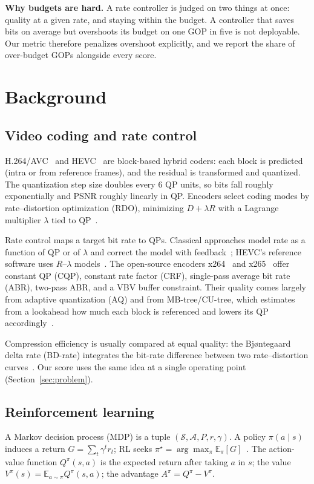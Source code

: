 \documentclass[conference]{IEEEtran}
\begin{document}
\textbf{Why budgets are hard.} A rate controller is judged on two things at once: quality at a given rate, and staying within the budget. A controller that saves bits on average but overshoots its budget on one GOP in five is not deployable. Our metric therefore penalizes overshoot explicitly, and we report the share of over-budget GOPs alongside every score.

\section{Background}
\subsection{Video coding and rate control}
H.264/AVC~\cite{wiegand2003h264} and HEVC~\cite{sullivan2012hevc} are block-based hybrid coders: each block is predicted (intra or from reference frames), and the residual is transformed and quantized. The quantization step size doubles every 6 QP units, so bits fall roughly exponentially and PSNR roughly linearly in QP. Encoders select coding modes by rate--distortion optimization (RDO), minimizing $D + \lambda R$ with a Lagrange multiplier $\lambda$ tied to QP~\cite{sullivan1998rdo,ortega1998rd}.

Rate control maps a target bit rate to QPs. Classical approaches model rate as a function of QP or of $\lambda$ and correct the model with feedback~\cite{chen2007rcsurvey}; HEVC's reference software uses $R$--$\lambda$ models~\cite{li2014lambda}. The open-source encoders x264~\cite{x264} and x265~\cite{x265} offer constant QP (CQP), constant rate factor (CRF), single-pass average bit rate (ABR), two-pass ABR, and a VBV buffer constraint. Their quality comes largely from adaptive quantization (AQ) and from MB-tree/CU-tree, which estimates from a lookahead how much each block is referenced and lowers its QP accordingly~\cite{garrett2009mbtree}.

Compression efficiency is usually compared at equal quality: the Bj{\o}ntegaard delta rate (BD-rate) integrates the bit-rate difference between two rate--distortion curves~\cite{bjontegaard2001}. Our score uses the same idea at a single operating point (Section~\ref{sec:problem}).

\subsection{Reinforcement learning}
A Markov decision process (MDP) is a tuple $(\mathcal{S},\mathcal{A},P,r,\gamma)$. A policy $\pi(a\mid s)$ induces a return $G = \sum_t \gamma^t r_t$; RL seeks $\pi^\star = \arg\max_\pi \mathbb{E}_\pi[G]$~\cite{sutton2018rl}. The action-value function $Q^\pi(s,a)$ is the expected return after taking $a$ in $s$; the value $V^\pi(s) = \mathbb{E}_{a\sim\pi}Q^\pi(s,a)$; the advantage $A^\pi = Q^\pi - V^\pi$.
\end{document}

